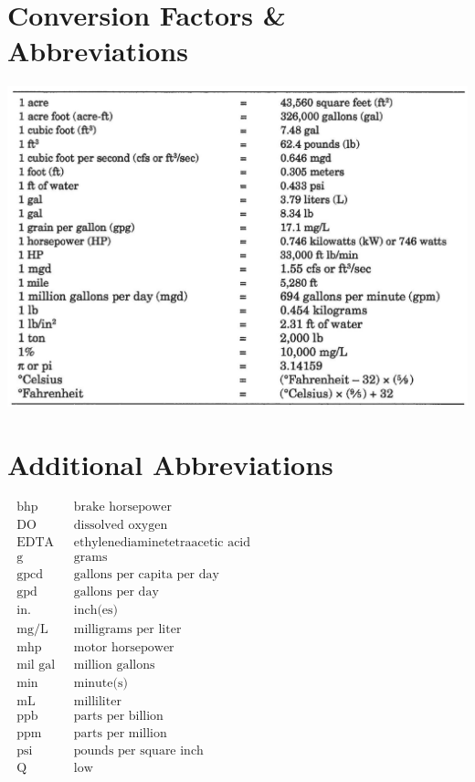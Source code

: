 \documentclass[10pt]{article}
\begin{document}
\section{Conversion Factors \& Abbreviations}
\includegraphics[max width=\textwidth]{2022_11_10_d6923b5a412978ed01fcg-59}

\section{Additional Abbreviations}
$\begin{array}{ll}\text { bhp } & \text { brake horsepower } \\ \text { DO } & \text { dissolved oxygen } \\ \text { EDTA } & \text { ethylenediaminetetraacetic acid } \\ \text { g } & \text { grams } \\ \text { gpcd } & \text { gallons per capita per day } \\ \text { gpd } & \text { gallons per day } \\ \text { in. } & \text { inch(es) } \\ \text { mg/L } & \text { milligrams per liter } \\ \text { mhp } & \text { motor horsepower } \\ \text { mil gal } & \text { million gallons } \\ \text { min } & \text { minute(s) } \\ \text { mL } & \text { milliliter } \\ \text { ppb } & \text { parts per billion } \\ \text { ppm } & \text { parts per million } \\ \text { psi } & \text { pounds per square inch } \\ \text { Q } & \text { low }\end{array}$
\end{document}
